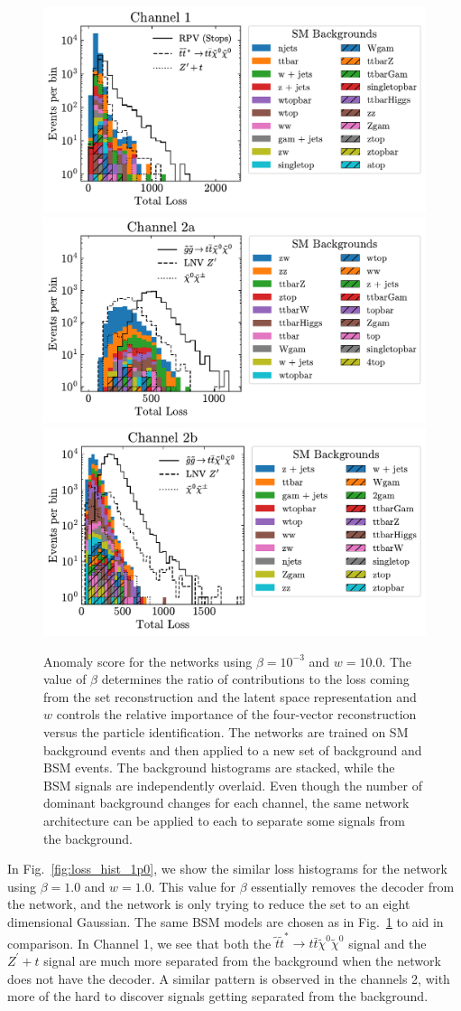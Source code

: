\documentclass[submission, Phys]{SciPost}
\begin{document}
\begin{figure}[t]
    \begin{center}
    \includegraphics[width=0.45\linewidth]{figures/Channel1_losshist_0p001_10p0.pdf}
    \includegraphics[width=0.45\linewidth]{figures/Channel2a_losshist_0p001_10p0.pdf}
    \includegraphics[width=0.45\linewidth]{figures/Channel2b_losshist_0p001_10p0.pdf}
    \caption{
        Anomaly score for the networks using $\beta=10^{-3}$ and $w=10.0$.
        The value of $\beta$ determines the ratio of contributions to the loss coming from the set reconstruction and the latent space representation and $w$ controls the relative importance of the four-vector reconstruction versus the particle identification.
        The networks are trained on SM background events and then applied to a new set of background and BSM events.
        The background histograms are stacked, while the BSM signals are independently overlaid.
        Even though the number of dominant background changes for each channel, the same network architecture can be applied to each to separate some signals from the background.
    }
    \label{fig:loss_hist_0p001}
\end{center}
\end{figure}

In Fig.~\ref{fig:loss_hist_1p0}, we show the similar loss histograms for the network using $\beta=1.0$ and $w=1.0$. 
This value for $\beta$ essentially removes the decoder from the network, and the network is only trying to reduce the set to an eight dimensional Gaussian.
The same BSM models are chosen as in Fig.~\ref{fig:loss_hist_0p001} to aid in comparison.
In Channel 1, we see that both the $\tilde{t}\tilde{t}^* \rightarrow t\bar{t}\tilde{\chi}^0\tilde{\chi}^0$ signal and the $Z^{\prime} + t$ signal are much more separated from the background when the network does not have the decoder.
A similar pattern is observed in the channels 2, with more of the hard to discover signals getting separated from the background.
\end{document}
